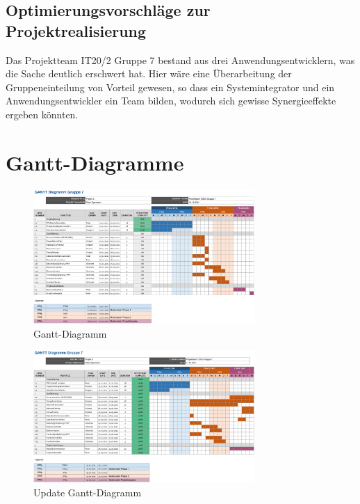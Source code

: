 \documentclass[a4paper,
    11pt,
    headings=small,
    ngerman,
    listof=totoc,
    numbers=noenddot]{scrreprt}[2021/11/13]
\begin{document}
\section{Optimierungsvorschläge zur Projektrealisierung}

Das Projektteam IT20/2 Gruppe 7 bestand aus drei Anwendungsentwicklern, was die Sache deutlich erschwert hat. Hier wäre eine Überarbeitung der Gruppeneinteilung von Vorteil gewesen, so dass ein Systemintegrator und ein Anwendungsentwickler ein Team bilden, wodurch sich gewisse Synergieeffekte ergeben könnten.


\newpage

\listoffigures
\listoftables
\lstlistoflistings

\newpage

\appendix
{}



\chapter{Gantt-Diagramme}

\begin{figure}[h!]
  \centering
  \includegraphics[angle=90,origin=c,width=0.75\textwidth]{data/Gantt.png}
  \caption{Gantt-Diagramm}
  \label{fig:Gantt}
\end{figure}

\newpage

\begin{figure}[h!]
  \centering
  \includegraphics[angle=90,origin=c,width=0.75\textwidth]{data/Gantt_Abschluss.png}
  \caption{Update Gantt-Diagramm}
  \label{fig:GanttUpdate}
\end{figure}
\end{document}
